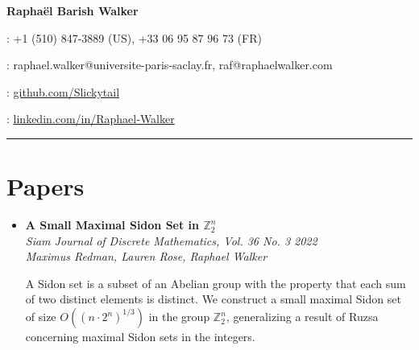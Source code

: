 \documentclass[12pt,letterpaper]{article}
\begin{document}

        {\LARGE{\textbf{Raphaël Barish Walker}}}\vspace{7pt}

        \faPhone : +1 (510) 847-3889 (US), +33 06 95 87 96 73 (FR)\vspace{4pt}

        \faEnvelope : raphael.walker@universite-paris-saclay.fr, raf@raphaelwalker.com\vspace{4pt}

        \faGithub : \href{https://github.com/Slickytail}{github.com/Slickytail}\vspace{4pt}

        \faLinkedinSquare : \href{https://linkedin.com/in/raphael-walker}{linkedin.com/in/Raphael-Walker}\vspace{4pt}


\hrule

\section*{Papers}
\begin{itemize}[label=]
    \item
        \textbf{A Small Maximal Sidon Set in $\mathbb{Z}_2^n$}\\
        \textit{Siam Journal of Discrete Mathematics, Vol. 36 No. 3 \hfill 2022}\\
        \textit{Maximus Redman, Lauren Rose, Raphael Walker}

        A Sidon set is a subset of an Abelian group with the property that each sum of two distinct elements is distinct. We construct a small maximal Sidon set of size $O((n \cdot 2^n)^{1/3})$ in the group ${\mathbb{Z}}_2^n$, generalizing a result of Ruzsa concerning maximal Sidon sets in the integers.

\end{itemize}
\end{document}
